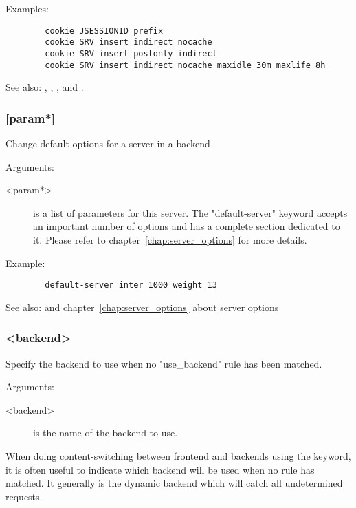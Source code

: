   Examples:
  \begin{verbatim}
        cookie JSESSIONID prefix
        cookie SRV insert indirect nocache
        cookie SRV insert postonly indirect
        cookie SRV insert indirect nocache maxidle 30m maxlife 8h
  \end{verbatim}

  See also: , , , 
             and .

\subsubsection[default-server]{ [param*]}
  Change default options for a server in a backend
  
  
  Arguments:
  \begin{description}
  \item[<param*>]  is a list of parameters for this server. The "default-server"
              keyword accepts an important number of options and has a complete
              section dedicated to it. Please refer to chapter~\ref{chap:server_options} for more
              details.
  \end{description}

  Example:
  \begin{verbatim}
        default-server inter 1000 weight 13
  \end{verbatim}

  See also:  and chapter~\ref{chap:server_options} about server options

\subsubsection[default\_backend]{ <backend>}

  Specify the backend to use when no "use\_backend" rule has been matched.
  
  
  Arguments:
  \begin{description}
  \item[<backend>] is the name of the backend to use.
  \end{description}

  When doing content-switching between frontend and backends using the
   keyword, it is often useful to indicate which backend will be
  used when no rule has matched. It generally is the dynamic backend which
  will catch all undetermined requests.

